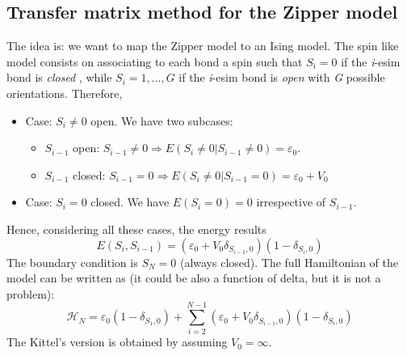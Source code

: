 \documentclass[../../Main/Main.tex]{subfiles}
\begin{document}
\subsection{Transfer matrix method for the Zipper model}
The idea is: we want to map the Zipper model to an Ising model. The spin like model consists on associating to each bond a spin such that \( S_i = 0 \) if the \emph{i}-esim bond is \emph{closed} , while \( S_i = 1, \dots, G \) if the \emph{i}-esim bond is \emph{open} with \emph{G} possible orientations. Therefore,
\begin{itemize}
  \item Case: \( S_i \neq 0 \) open. We have two subcases:
  \begin{itemize}
  \item \( S_{i-1}\) open: \( S_{i-1} \neq 0 \Rightarrow E (S_i \neq 0 | S_{i-1} \neq 0) = \varepsilon _0\).
  \item \( S_{i-1}\) closed: \( S_{i-1} = 0 \Rightarrow  E (S_i \neq 0 | S_{i-1} = 0) = \varepsilon _0 + V_0 \)
  \end{itemize}
\item Case: \( S_i = 0 \) closed. We have \( E (S_i=0)=0 \) irrespective of \( S_{i-1} \).
\end{itemize}
Hence, considering all these cases, the energy results
\begin{equation}
  E ( S_i, S_{i-1}) = ( \varepsilon _0 + V_0 \delta _{S_{i-1},0}) (1- \delta _{S_i,0})
\end{equation}
The boundary condition is \( S_N =0 \) (always closed).
The full Hamiltonian of the model can be written as (it could be also a function of delta, but it is not a problem):
\begin{equation}
  \mathcal{H}_N = \varepsilon _0 (1- \delta _{S_1,0}) + \sum_{i=2}^{N-1} (\varepsilon _0 + V_0 \delta _{S_{i-1},0})(1- \delta _{S_i,0})
\end{equation}
The Kittel's version is obtained by assuming \( V_0 = \infty  \).
\end{document}
